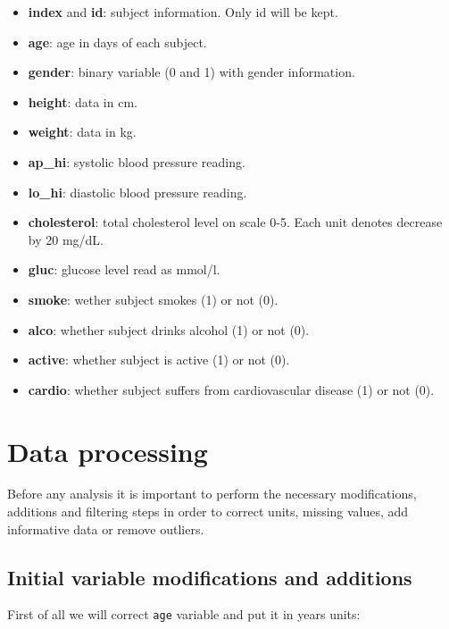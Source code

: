 \documentclass[
]{article}
\newenvironment{Shaded}{\begin{snugshade}}{\end{snugshade}}
\newcommand{\DecValTok}[1]{\textcolor[rgb]{0.00,0.00,0.81}{#1}}
\newcommand{\FunctionTok}[1]{\textcolor[rgb]{0.13,0.29,0.53}{\textbf{#1}}}
\newcommand{\NormalTok}[1]{#1}
\newcommand{\OtherTok}[1]{\textcolor[rgb]{0.56,0.35,0.01}{#1}}
\newcommand{\SpecialCharTok}[1]{\textcolor[rgb]{0.81,0.36,0.00}{\textbf{#1}}}
\providecommand{\tightlist}{%
  \setlength{\itemsep}{0pt}\setlength{\parskip}{0pt}}
\begin{document}
\begin{itemize}
\tightlist
\item
  \textbf{index} and \textbf{id}: subject information. Only id will be
  kept.
\item
  \textbf{age}: age in days of each subject.
\item
  \textbf{gender}: binary variable (0 and 1) with gender information.
\item
  \textbf{height}: data in cm.
\item
  \textbf{weight}: data in kg.
\item
  \textbf{ap\_hi}: systolic blood pressure reading.
\item
  \textbf{lo\_hi}: diastolic blood pressure reading.
\item
  \textbf{cholesterol}: total cholesterol level on scale 0-5. Each unit
  denotes decrease by 20 mg/dL.
\item
  \textbf{gluc}: glucose level read as mmol/l.
\item
  \textbf{smoke}: wether subject smokes (1) or not (0).
\item
  \textbf{alco}: whether subject drinks alcohol (1) or not (0).
\item
  \textbf{active}: whether subject is active (1) or not (0).
\item
  \textbf{cardio}: whether subject suffers from cardiovascular disease
  (1) or not (0).
\end{itemize}

\hypertarget{data-processing}{%
\section{Data processing}\label{data-processing}}

Before any analysis it is important to perform the necessary
modifications, additions and filtering steps in order to correct units,
missing values, add informative data or remove outliers.

\hypertarget{initial-variable-modifications-and-additions}{%
\subsection{Initial variable modifications and
additions}\label{initial-variable-modifications-and-additions}}

First of all we will correct \texttt{age} variable and put it in years
units:

\begin{Shaded}
\end{Shaded}
\end{document}
